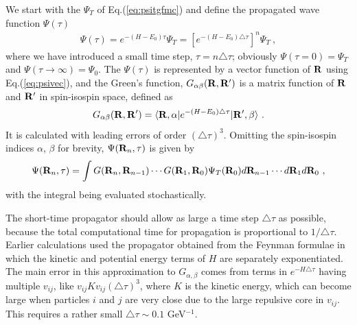 We start with the $\Psi_{T}$ of Eq.(\ref{eq:psitgfmc}) and define the propagated
wave function $\Psi(\tau)$
\begin{eqnarray}
   \Psi(\tau) = e^{-({H}-E_{0})\tau} \Psi_{T}
              = \left[e^{-({H}-E_{0})\triangle\tau}\right]^{n} \Psi_{T} \ ,
\end{eqnarray}
where we have introduced a small time step, $\tau=n\triangle\tau$;
obviously $\Psi(\tau=0) =  \Psi_{T}$ and
$\Psi(\tau \rightarrow \infty) = \Psi_{0}$.
The $\Psi (\tau)$ is represented by a vector function of $\bf R$ using
Eq.(\ref{eq:psivec}), and the Green's function,
$G_{\alpha\beta}({\bf R},{\bf R}^{\prime})$ is a matrix function of
$\bf R$ and ${\bf R}^{\prime}$ in spin-isospin space, defined as
\begin{equation}
G_{\alpha\beta}({\bf R},{\bf R}^{\prime})= \langle {\bf
R},\alpha|e^{-({H}-E_{0})\triangle\tau}|{\bf R}^{\prime},\beta\rangle \ .
\label{eq:gfunction}
\end{equation}
It is calculated with leading errors of order $(\triangle\tau)^{3}$.
Omitting the spin-isospin indices $\alpha$, $\beta$ for brevity,
$\Psi({\bf R}_{n},\tau)$ is given by
\begin{equation}
\Psi({\bf R}_{n},\tau) = \int G({\bf R}_{n},{\bf R}_{n-1})\cdots G({\bf
R}_{1},{\bf R}_{0})\Psi_{T}({\bf R}_{0})d{\bf R}_{n-1}\cdots d{\bf R}_{1}d{\bf
R}_{0} \ ,
\label{eq:gfmcpsi}
\end{equation}
with the integral being evaluated stochastically.

The short-time propagator should allow as large a time step $\triangle\tau$ as
possible, because the total computational time for propagation is proportional
to $1/\triangle\tau$.
Earlier calculations \cite{PPCW95,C87,C88} used the propagator obtained from
the Feynman formulae in which the kinetic and potential energy terms
of $H$ are separately exponentiated.
The main error in this approximation to $G_{\alpha,\beta}$ comes from terms in
$e^{-{H}\triangle\tau}$ having multiple $v_{ij}$, like
$v_{ij}Kv_{ij}(\triangle\tau)^{3}$, where $K$ is the kinetic energy,
which can become large when particles $i$ and $j$ are very close
due to the large repulsive core in $v_{ij}$.
This requires a rather small $\triangle\tau \sim 0.1$
GeV$^{-1}$.

